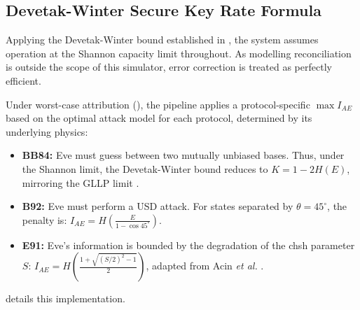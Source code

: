 \documentclass[11pt, a4paper]{report}
\begin{document}
\newpage
\subsection{Devetak-Winter Secure Key Rate Formula}
\label{subsec:DWsec}

Applying the Devetak-Winter bound established in , the system assumes operation at the Shannon capacity limit throughout. As modelling \gls{reconciliation} is outside the scope of this simulator, error correction is treated as perfectly efficient.

Under worst-case attribution (), the pipeline applies a protocol-specific $\max I_{AE}$ based on the optimal attack model for each protocol, determined by its underlying physics:

\begin{itemize}
    \item \textbf{BB84:} Eve must guess between two mutually unbiased bases. Thus, under the Shannon limit, the Devetak-Winter bound reduces to $K = 1 - 2H(E)$, mirroring the GLLP limit \cite{GLLP2004}.
    \item \textbf{B92:} Eve must perform a USD attack. For states separated by $\theta = 45^\circ$, the penalty is: $I_{AE} = H\left(\frac{E}{1 - \cos 45^\circ}\right)$.
    \item \textbf{E91:} Eve's information is bounded by the degradation of the \gls{chsh} parameter $S$: $I_{AE} = H\left(\frac{1 + \sqrt{(S/2)^2 - 1}}{2}\right)$, adapted from Acin \textit{et al.} \cite{Acin2007}.
\end{itemize}

 details this implementation.
\end{document}
